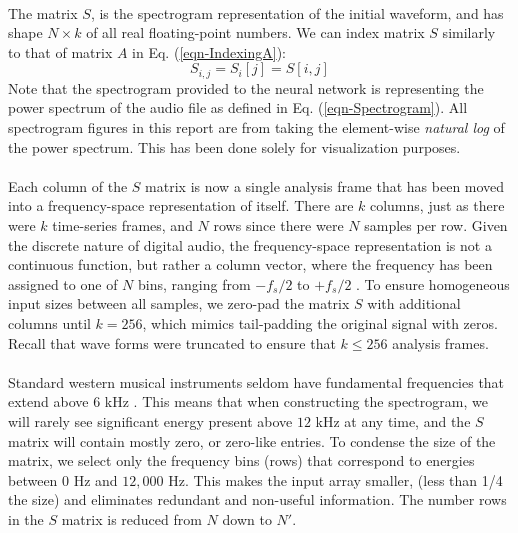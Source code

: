 \documentclass[12pt,letterpaper]{article}
\begin{document}
\paragraph*{}The matrix $S$, is the spectrogram representation of the initial waveform, and has shape $N \times k$ of all real floating-point numbers. We can index matrix $S$ similarly to that of matrix $A$ in Eq. (\ref{eqn-IndexingA}):
\begin{equation}
\label{eqn-IndexingS}
S_{i,j} = S_i[j] = S[i,j]
\end{equation}
Note that the spectrogram provided to the neural network is representing the power spectrum of the audio file as defined in Eq. (\ref{eqn-Spectrogram}). All spectrogram figures in this report are from taking the element-wise \textit{natural log} of the power spectrum. This has been done solely for visualization purposes.

\paragraph*{}Each column of the $S$ matrix is now a single analysis frame that has been moved into a frequency-space representation of itself. There are $k$ columns, just as there were $k$ time-series frames, and $N$ rows since there were $N$ samples per row. Given the discrete nature of digital audio, the frequency-space representation is not a continuous function, but rather a column vector, where the frequency has been assigned to one of $N$ bins, ranging from $-f_s / 2$ to $+f_s/2$ \cite{Short,Peatross}. To ensure homogeneous input sizes between all samples, we zero-pad the matrix $S$ with additional columns until $k = 256$, which mimics tail-padding the original signal with zeros. Recall that wave forms were truncated to ensure that $k \leq 256$ analysis frames.

\paragraph*{}Standard western musical instruments seldom have fundamental frequencies that extend above $6$ kHz \cite{Olson,Virtanen,White}. This means that when constructing the spectrogram, we will rarely see significant energy present above $12$ kHz at any time, and the $S$ matrix will contain mostly zero, or zero-like entries. To condense the size of the matrix, we select only the frequency bins (rows) that correspond to energies between $0$ Hz and $12,000$ Hz. This makes the input array smaller, (less than 1/4 the size) and eliminates redundant and non-useful information. The number rows in the $S$ matrix is reduced from $N$ down to $N'$. 
\end{document}
